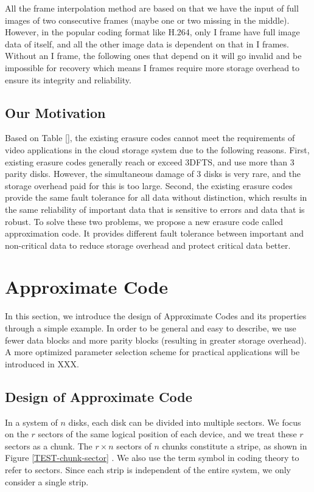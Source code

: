\documentclass[conference]{IEEEtran}
\begin{document}
All the frame interpolation method are based on that we have the input of full images of two consecutive frames (maybe one or two missing in the middle). However, in the popular coding format like H.264, only I frame have full image data of itself, and all the other image data is dependent on that in I frames. Without an I frame, the following ones that depend on it will go invalid and be impossible for recovery which means I frames require more storage overhead to ensure its integrity and reliability.

\subsection{Our Motivation}
Based on Table [], the existing erasure codes cannot meet the requirements of video applications in the cloud storage system due to the following reasons. First, existing erasure codes generally reach or exceed 3DFTS, and use more than 3 parity disks. However, the simultaneous damage of 3 disks is very rare, and the storage overhead paid for this is too large. Second, the existing erasure codes provide the same fault tolerance for all data without distinction, which results in the same reliability of important data that is sensitive to errors and data that is robust. To solve these two problems, we propose a new erasure code called approximation code. It provides different fault tolerance between important and non-critical data to reduce storage overhead and protect critical data better.

\section{Approximate Code}
In this section, we introduce the design of Approximate Codes and its properties through a simple example. In order to be general and easy to describe, we use fewer data blocks and more parity blocks (resulting in greater storage overhead). A more optimized parameter selection scheme for practical applications will be introduced in XXX.

\subsection{Design of Approximate Code}
In a system of $n$ disks, each disk can be divided into multiple sectors. We focus on the $r$ sectors of the same logical position of each device, and we treat these $r$ sectors as a chunk. The $r \times n$ sectors of $n$ chunks constitute a stripe, as shown in Figure \ref{TEST-chunk-sector} . We also use the term symbol in coding theory to refer to sectors. Since each strip is independent of the entire system, we only consider a single strip.
\end{document}

